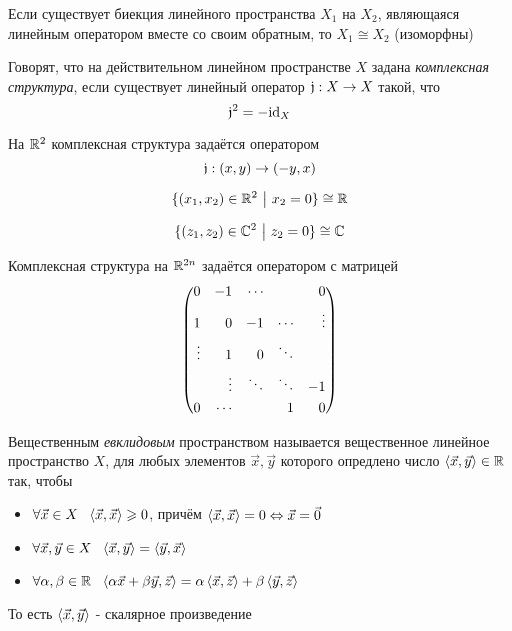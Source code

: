 \begin{definition}
	Если существует биекция линейного пространства $X_1$ на $X_2$, являющаяся линейным оператором вместе со своим обратным, то $X_1 \cong X_2$ (изоморфны)
\end{definition}

\begin{definition}
	Говорят, что на действительном линейном пространстве $X$ задана \textit{комплексная структура}, если существует линейный оператор $\mathfrak{j}: X \to X$ такой, что
	\[
		\mathfrak{j}^2  = -\mathrm{id}_X
	\]
\end{definition}

\begin{example}
	На $\mathbb{R}^2$ комплексная структура задаётся оператором
	\[
		\mathfrak{j}: (x, y) \rightarrow (-y, x)
	\]
\end{example}

\begin{example}
	\[
		\{(x_1, x_2) \in \mathbb{R}^2 \ \big|\  x_2 = 0\} \cong \mathbb{R}
	\]
\end{example}

\begin{example}
	\[
		\{(z_1, z_2) \in \mathbb{C}^2 \ \big|\  z_2 = 0\} \cong \mathbb{C}
	\]
\end{example}

\begin{lemma}
	Комплексная структура на $\mathbb{R}^{2n}$ задаётся оператором с матрицей
	\[
		\left(\begin{aligned}
		0& & -1& & \cdots& & & & 0 \\
		1& & 0& & -1& & \cdots& & \vdots \\
		\vdots& & 1& & 0& & \ddots& & \\
		& & \vdots& & \ddots& & \ddots& & -1 \\
		0& & \cdots& & & & 1& & 0
		\end{aligned}\right)
	\]
\end{lemma}

\begin{definition}
	Вещественным \textit{евклидовым} пространством называется вещественное линейное пространство $X$, для любых элементов $\vec{x}, \vec{y}$ которого опредлено число $\left\langle\vec{x}, \vec{y}\right\rangle \in \mathbb{R}$ так, чтобы
	\begin{itemize}
		\item $\forall \vec{x} \in X\ \ \trbr{\vec{x}, \vec{x}} \ge 0$, причём $\left\langle\vec{x}, \vec{x}\right\rangle = 0 \Leftrightarrow \vec{x} = \vec{0}$
		
		\item $\forall \vec{x}, \vec{y} \in X\ \ \trbr{\vec{x}, \vec{y}} = \trbr{\vec{y}, \vec{x}}$
		
		\item $\forall \alpha, \beta \in \R\ \ \trbr{\alpha\vec{x} + \beta\vec{y}, \vec{z}} = \alpha\trbr{\vec{x}, \vec{z}} + \beta\trbr{\vec{y}, \vec{z}}$
	\end{itemize}
	То есть $\left\langle\vec{x}, \vec{y}\right\rangle$ - скалярное произведение
\end{definition}

